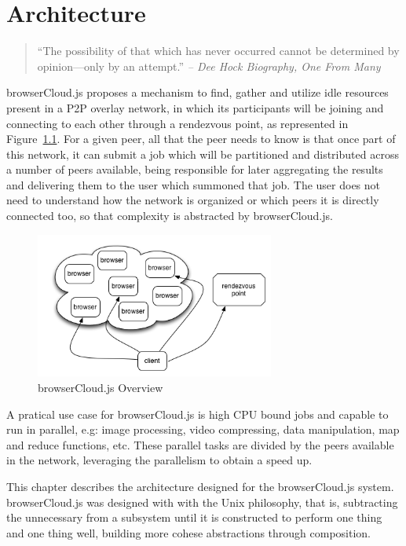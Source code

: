 \chapter{Architecture}\label{ch:architecture}

\begin{quotation}
    “The possibility of that which has never occurred cannot be determined by opinion—only by an attempt.”
    {\small\it -- Dee Hock Biography, One From Many}
\end{quotation}

browserCloud.js proposes a mechanism to find, gather and utilize idle resources present in a P2P overlay network, in which its participants will be joining and connecting to each other through a rendezvous point, as represented in Figure~\ref{fig:b-e}. For a given peer, all that the peer needs to know is that once part of this network, it can submit a job which will be partitioned and distributed across a number of peers available, being responsible for later aggregating the results and delivering them to the user which summoned that job. The user does not need to understand how the network is organized or which peers it is directly connected too, so that complexity is abstracted by browserCloud.js.

\begin{figure}[h!]
  \centering
  \includegraphics[width=0.7\textwidth]{figs/birds-eye}
  \caption{browserCloud.js Overview}
  \label{fig:b-e}
\end{figure}

A pratical use case for browserCloud.js is high CPU bound jobs and capable to run in parallel, e.g: image processing, video compressing, data manipulation, map and reduce functions, etc. These parallel tasks are divided by the peers available in the network, leveraging the parallelism to obtain a speed up.

This chapter describes the architecture designed for the browserCloud.js system. browserCloud.js was designed with with the Unix philosophy, that is, subtracting the unnecessary from a subsystem until it is constructed to perform one thing and one thing well, building more cohese abstractions through composition.


